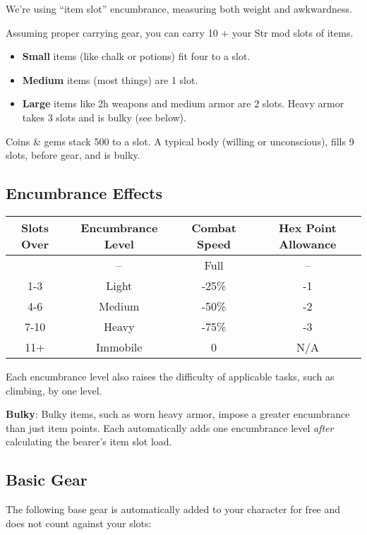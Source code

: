 \documentclass{article}
\begin{document}
\begin{multicols}{2}
We're using ``item slot'' encumbrance, measuring both weight and
awkwardness.

Assuming proper carrying gear, you can carry 10 + your Str mod slots of
items.

\begin{itemize}
\tightlist
\item
  \textbf{Small} items (like chalk or potions) fit four to a slot.
\item
  \textbf{Medium} items (most things) are 1 slot.
\item
  \textbf{Large} items like 2h weapons and medium armor are 2 slots.
  Heavy armor takes 3 slots and is bulky (see below).
\end{itemize}

Coins \& gems stack 500 to a slot. A typical body (willing or
unconscious), fills 9 slots, before gear, and is bulky.

\subsection{Encumbrance Effects}\label{encumbrance-effects}

\begin{longtable}[]{@{}cccc@{}}
\toprule\noalign{}
Slots Over & Encumbrance Level & Combat Speed & Hex Point Allowance \\
\midrule\noalign{}
\endhead
\bottomrule\noalign{}
\endlastfoot
0 & -- & Full & -- \\
1-3 & Light & -25\% & -1 \\
4-6 & Medium & -50\% & -2 \\
7-10 & Heavy & -75\% & -3 \\
11+ & Immobile & 0 & N/A \\
\end{longtable}

Each encumbrance level also raises the difficulty of applicable tasks,
such as climbing, by one level.

\textbf{Bulky}: Bulky items, such as worn heavy armor, impose a greater
encumbrance than just item points. Each automatically adds one
encumbrance level \emph{after} calculating the bearer's item slot load.

\subsection{Basic Gear}\label{basic-gear}

The following base gear is automatically added to your character for
free and does not count against your slots:


\end{multicols}
\end{document}
